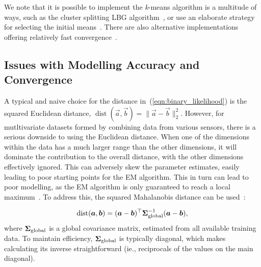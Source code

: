 We note that it is possible to implement the \mbox{{\it k}-means} algorithm is a multitude of ways,
such as the cluster splitting LBG algorithm~\cite{Linde80},
or use an elaborate strategy for selecting the initial means~\cite{Arthur_2007}.
There are also alternative implementations offering relatively fast convergence~\cite{Elkan_2003}.


\subsection{Issues with Modelling Accuracy and Convergence}

A typical and naive choice for the distance in~(\ref{eqn:binary_likelihood})
is the squared Euclidean distance, \mbox{$\operatorname{dist}(\Vec{a}, \Vec{b}) = \| \Vec{a} - \Vec{b} \|^{2}_{2}$}.
However, for mutltivariate datasets formed by combining data from various sensors, there is a serious downside to using the Euclidean distance.
When one of the dimensions within the data has a much larger range than the other dimensions,
it will dominate the contribution to the overall distance, with the other dimensions effectively ignored.
This can adversely skew the parameter estimates, easily leading to poor starting points for the EM algorithm.
This in turn can lead to poor modelling, as the EM algorithm is only guaranteed to reach a local maximum~\cite{Dempster77,Duda01,Mitchell97}.
To address this, the squared Mahalanobis distance can be used~\cite{Bishop_2006,Duda01}:

\begin{equation}
\operatorname{dist}({\boldsymbol{a}}, {\boldsymbol{b}}) = ({\boldsymbol{a}} - {\boldsymbol{b}})^\top {\boldsymbol{\Sigma}}^{-1}_{\mathrm{global}} ({\boldsymbol{a}} - {\boldsymbol{b}}),
\end{equation}
\noindent where ${\boldsymbol{\Sigma}}_{\mathrm{global}}$ is a global covariance matrix, estimated from all available training data.
To maintain efficiency, ${\boldsymbol{\Sigma}}_{\mathrm{global}}$ is typically diagonal,
which makes calculating its inverse straightforward (ie., reciprocals of the values on the main diagonal).



